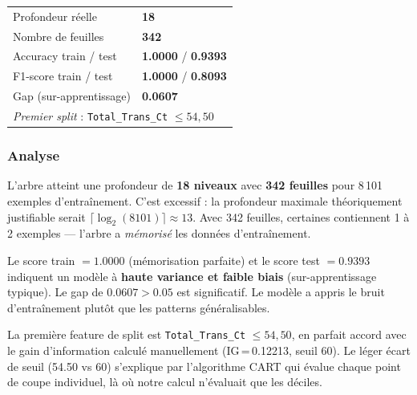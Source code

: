 \documentclass[12pt,a4paper]{article}
\newcommand{\feature}[1]{\texttt{\small #1}}
\newcommand{\score}[1]{\textbf{#1}}
\begin{document}
\begin{resultbox}
\begin{tabular}{ll}
  Profondeur réelle   & \score{18} \\
  Nombre de feuilles  & \score{342} \\
  Accuracy train / test & \score{1.0000} / \score{0.9393} \\
  F1-score train / test & \score{1.0000} / \score{0.8093} \\
  Gap (sur-apprentissage) & \score{0.0607} \\[4pt]
  \multicolumn{2}{l}{\emph{Premier split} : \feature{Total\_Trans\_Ct} $\leq 54{,}50$} \\
\end{tabular}
\end{resultbox}

\subsubsection{Analyse}

\begin{reponsebox}
L'arbre atteint une profondeur de \textbf{18 niveaux} avec \textbf{342 feuilles}
pour 8\,101 exemples d'entraînement. C'est excessif : la profondeur maximale théoriquement
justifiable serait $\lceil\log_2(8101)\rceil \approx 13$. Avec 342 feuilles, certaines contiennent
1 à 2 exemples — l'arbre a \emph{mémorisé} les données d'entraînement.
\end{reponsebox}

\begin{reponsebox}
Le score train $= 1.0000$ (mémorisation parfaite) et le score test $= 0.9393$ indiquent
un modèle à \textbf{haute variance et faible biais} (sur-apprentissage typique).
Le gap de $0.0607 > 0.05$ est significatif. Le modèle a appris le bruit
d'entraînement plutôt que les patterns généralisables.
\end{reponsebox}

\begin{reponsebox}
La première feature de split est \feature{Total\_Trans\_Ct} $\leq 54{,}50$, en parfait accord
avec le gain d'information calculé manuellement (IG\,=\,0.12213, seuil 60).
Le léger écart de seuil (54.50 vs 60) s'explique par l'algorithme CART qui évalue
chaque point de coupe individuel, là où notre calcul n'évaluait que les déciles.
\end{reponsebox}
\end{document}
